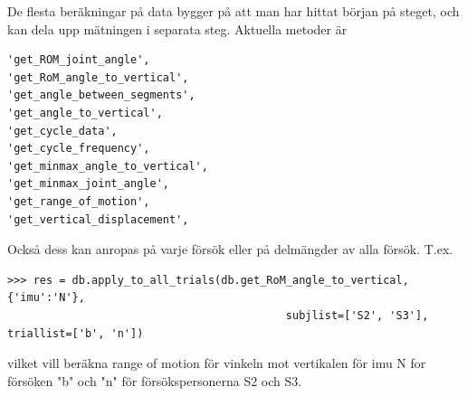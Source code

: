 \documentclass[captions=tableheading]{scrartcl}
\begin{document}
De flesta beräkningar på data bygger på att man har hittat början på steget, och kan dela upp mätningen i separata steg. Aktuella metoder är 
\begin{verbatim}
'get_ROM_joint_angle',
'get_RoM_angle_to_vertical',
'get_angle_between_segments',
'get_angle_to_vertical',
'get_cycle_data',
'get_cycle_frequency',
'get_minmax_angle_to_vertical',
'get_minmax_joint_angle',
'get_range_of_motion',
'get_vertical_displacement',
\end{verbatim}
Också dess kan anropas på varje försök eller på delmängder av alla försök. T.ex.
\begin{verbatim}
>>> res = db.apply_to_all_trials(db.get_RoM_angle_to_vertical, {'imu':'N'},
                                           subjlist=['S2', 'S3'], triallist=['b', 'n'])
\end{verbatim}
vilket vill beräkna range of motion för vinkeln mot vertikalen för imu N for försöken "b" och "n" för försökspersonerna S2 och S3.
\end{document}
